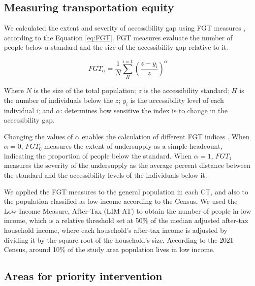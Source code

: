 \documentclass[preprint, 3p,
authoryear]{elsarticle} %
\begin{document}
\subsection{Measuring transportation
equity}\label{measuring-transportation-equity}

We calculated the extent and severity of accessibility gap using FGT
measures \citep{foster2010}, according to the Equation \ref{eq:FGT}. FGT
measures evaluate the number of people below a standard and the size of
the accessibility gap relative to it.

\begin{equation}
\label{eq:FGT}
FGT_\alpha = \frac{1}{N}\sum_{H}^{i=1}\left(\frac{z-y_i}{z}  \right)^{\alpha}
\end{equation}

Where \(N\) is the size of the total population; \(z\) is the
accessibility standard; \(H\) is the number of individuals below the
\(z\); \(y_i\) is the accessibility level of each individual i; and
\(\alpha\): determines how sensitive the index is to change in the
accessibility gap.

Changing the values of \(\alpha\) enables the calculation of different
FGT indices \citep{karner2024}. When \(\alpha = 0\), \(FGT_0\) measures
the extent of undersupply as a simple headcount, indicating the
proportion of people below the standard. When \(\alpha = 1\), \(FGT_1\)
measures the severity of the undersupply as the average percent distance
between the standard and the accessibility levels of the individuals
below it.

We applied the FGT measures to the general population in each CT, and
also to the population classified as low-income according to the Census.
We used the Low-Income Measure, After-Tax (LIM-AT) to obtain the number
of people in low income, which is a relative threshold set at 50\% of
the median adjusted after-tax household income, where each household's
after-tax income is adjusted by dividing it by the square root of the
household's size. According to the 2021 Census, around 10\% of the study
area population lives in low income.

\subsection{Areas for priority
intervention}\label{areas-for-priority-intervention}
\end{document}
